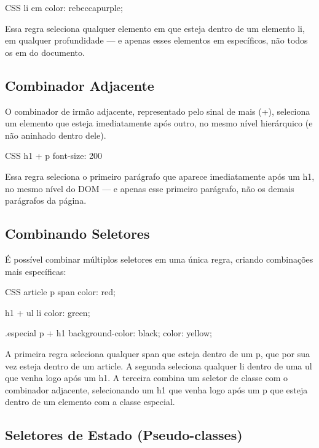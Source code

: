 \begin{codebox}{CSS}
li em {
  color: rebeccapurple;
}
\end{codebox}

Essa regra seleciona qualquer elemento em que esteja dentro de um elemento li, em qualquer profundidade — e apenas esses elementos em específicos, não todos os em do documento.

\subsection{Combinador Adjacente}

O combinador de irmão adjacente, representado pelo sinal de mais (+), seleciona um elemento que esteja imediatamente após outro, no mesmo nível hierárquico (e não aninhado dentro dele).

\begin{codebox}{CSS}
h1 + p {
  font-size: 200%
}
\end{codebox}

Essa regra seleciona o primeiro parágrafo que aparece imediatamente após um h1, no mesmo nível do DOM — e apenas esse primeiro parágrafo, não os demais parágrafos da página.

\subsection{Combinando Seletores}

É possível combinar múltiplos seletores em uma única regra, criando combinações mais específicas:

\begin{codebox}{CSS}
article p span {
  color: red;
}

h1 + ul li {
  color: green;
}

.especial p + h1 {
  background-color: black;
  color: yellow;
}
\end{codebox}

A primeira regra seleciona qualquer span que esteja dentro de um p, que por sua vez esteja dentro de um article. A segunda seleciona qualquer li dentro de uma ul que venha logo após um h1. A terceira combina um seletor de classe com o combinador adjacente, selecionando um h1 que venha logo após um p que esteja dentro de um elemento com a classe especial.

\subsection{Seletores de Estado (Pseudo-classes)}

